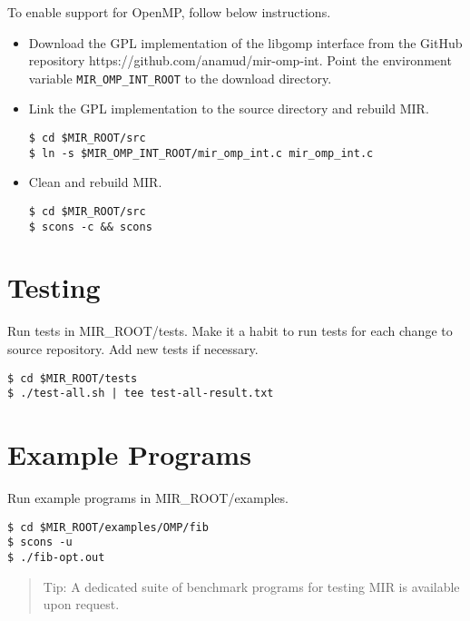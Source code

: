 \documentclass[11pt,a4paper]{article}
\begin{document}
To enable support for OpenMP, follow below instructions.

\begin{itemize}
    \item Download the GPL implementation of the libgomp interface from the GitHub repository \textsf{https://github.com/anamud/mir-omp-int}.  Point the environment variable \texttt{MIR\_OMP\_INT\_ROOT} to the download directory.

    \item Link the GPL implementation to the source directory and rebuild MIR.

\begin{lstlisting}[style=MyInputStyle]
$ cd $MIR_ROOT/src
$ ln -s $MIR_OMP_INT_ROOT/mir_omp_int.c mir_omp_int.c
\end{lstlisting}

    \item Clean and rebuild MIR.

\begin{lstlisting}[style=MyInputStyle]
$ cd $MIR_ROOT/src
$ scons -c && scons
\end{lstlisting}
\end{itemize}

\section{Testing}\label{sec:testing}

Run tests in \textsf{MIR\_ROOT/tests}. Make it a habit to run tests for each change to source repository. Add new tests if necessary.

\begin{lstlisting}[style=MyInputStyle]
$ cd $MIR_ROOT/tests
$ ./test-all.sh | tee test-all-result.txt
\end{lstlisting}

\section{Example Programs}\label{sec:examples}

Run example programs in \textsf{MIR\_ROOT/examples}.

\begin{lstlisting}[style=MyInputStyle]
$ cd $MIR_ROOT/examples/OMP/fib
$ scons -u
$ ./fib-opt.out
\end{lstlisting}

\begin{framed}
\begin{quote}
Tip: A dedicated suite of benchmark programs for testing MIR is available upon request.
\end{quote}
\end{framed}
\end{document}
